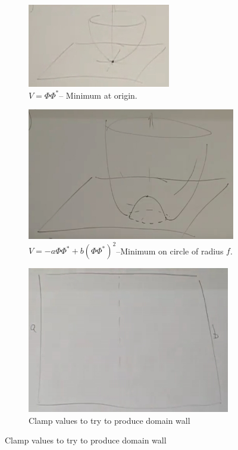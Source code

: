 \documentclass[]{article}
\begin{document}
\begin{figure}[H]
	\caption{Potentials}\label{fig:s-7-potentials}
	\begin{subfigure}[t]{0.45\textwidth}
		\caption{ $V=\Phi \Phi^*$-- Minimum at origin.}\label{fig:2-7-V-quad}
		\includegraphics[width=\textwidth]{2-7-V-quad}
	\end{subfigure}
	\hfill
	\begin{subfigure}[t]{0.45\textwidth}
		\caption{$V=-a \Phi \Phi^* + b (\Phi \Phi^*)^2$--Minimum on circle of radius $f$.}\label{fig:2-7-V-quartic}
		\includegraphics[width=\textwidth]{2-7-V-quartic}
	\end{subfigure}
	\begin{subfigure}[t]{0.45\textwidth}
		\caption{Clamp values to try to produce domain wall}\label{fig:2-7-V-quartic-domain-wall-ab}
		\includegraphics[width=\textwidth]{2-7-V-quartic-domain-wall-ab}

\end{subfigure}
\end{figure}
\end{document}
